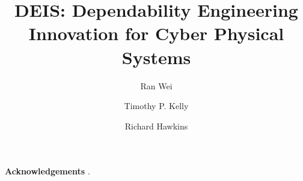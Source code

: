 \documentclass[runningheads,a4paper]{llncs}
\begin{document}
 
\title{\textbf{DEIS: Dependability Engineering Innovation for Cyber Physical Systems}}
\author{Ran Wei\and Timothy P. Kelly \and Richard Hawkins}
\maketitle

















\vspace{0.2cm}
\noindent\textbf{Acknowledgements} .

 
  
\end{document}
